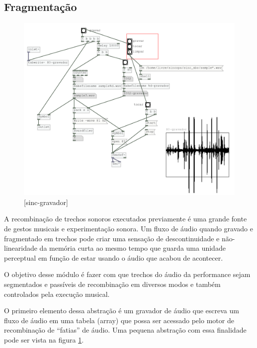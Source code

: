 \documentclass{ppgmus}
\begin{document}
\subsection {Fragmentação}


\begin{figure}
\includegraphics[scale=.6]{sinc-gravador}
\caption{[sinc-gravador]}
\label{sinc-gravador}
\end{figure}



A recombinação de trechos sonoros executados previamente é uma grande fonte
de gestos musicais e experimentação sonora. Um fluxo de áudio quando gravado
e fragmentado em trechos pode criar uma sensação de descontinuidade e não-linearidade
da memória curta ao mesmo tempo que guarda uma unidade perceptual em função de estar usando
o áudio que acabou de acontecer.

O objetivo desse módulo é fazer com que trechos do áudio da performance sejam segmentados e 
passíveis de recombinação em diversos modos e também controlados pela execução musical.

O primeiro elemento dessa abstração é um gravador de áudio que escreva um fluxo
de áudio em uma tabela (array) que possa ser acessado pelo motor de recombinação de ``fatias'' de áudio.
Uma pequena abstração com essa finalidade pode ser vista na figura \ref{sinc-gravador}.
\end{document}
